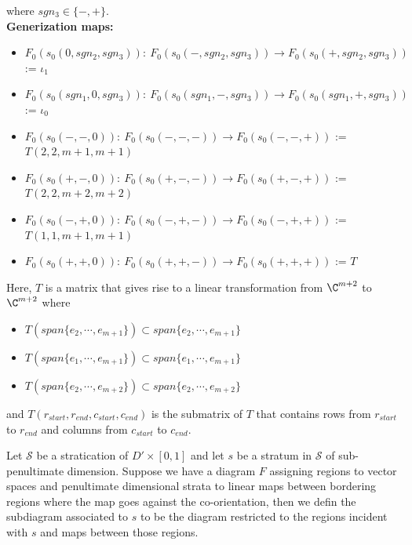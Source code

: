 where $sgn_3 \in \{-, + \}$.\\
\textbf{Generization maps:}
\begin{itemize}
\item $F_0(s_0(0,sgn_2,sgn_3)):~ F_0(s_0(-,sgn_2,sgn_3))\rightarrow F_0(s_0(+,sgn_2,sgn_3))$ := $\iota_1$ 

\item $F_0(s_0(sgn_1,0,sgn_3)):~ F_0(s_0(sgn_1,-,sgn_3))\rightarrow F_0(s_0(sgn_1,+,sgn_3))$ := $\iota_0$ 

\item $F_0(s_0(-,-,0)):~ F_0(s_0(-,-,-))\rightarrow F_0(s_0(-,-,+))$ := $T(2,2,m+1,m+1)$ 

\item $F_0(s_0(+,-,0)):~ F_0(s_0(+,-,-))\rightarrow F_0(s_0(+,-,+))$ := $T(2,2,m+2,m+2)$ 

\item $F_0(s_0(-,+,0)):~ F_0(s_0(-,+,-))\rightarrow F_0(s_0(-,+,+))$ := $T(1,1,m+1,m+1)$ 

\item $F_0(s_0(+,+,0)):~ F_0(s_0(+,+,-))\rightarrow F_0(s_0(+,+,+))$ := $T$ 
\end{itemize}
Here, $T$ is a matrix that gives rise to a linear transformation from $\C^{m+2}$ to $\C^{m+2}$ where
\begin{itemize}
\item $T(span\{ e_2, \cdots, e_{m+1} \}) \subset span\{ e_2, \cdots, e_{m+1} \}$

\item $T(span\{ e_1, \cdots, e_{m+1} \}) \subset span\{ e_1, \cdots, e_{m+1} \}$

\item $T(span\{ e_2, \cdots, e_{m+2} \}) \subset span\{ e_2, \cdots, e_{m+2} \}$
\end{itemize}
and $T(r_{start},r_{end},c_{start},c_{end})$ is the submatrix of $T$ that contains rows from $r_{start}$ to $r_{end}$ and columns from $c_{start}$ to $c_{end}$.
\begin{definition}
Let $\mathcal{S}$ be a stratication of $D'\times[0,1]$ and let $s$ be a stratum in $\mathcal{S}$ of sub-penultimate dimension. Suppose we have a diagram $F$ assigning regions to vector spaces and penultimate dimensional strata to linear maps between bordering regions where the map goes against the co-orientation, then we defin the subdiagram associated to $s$ to be the diagram restricted to the regions incident with $s$ and maps between those regions.
\end{definition}

